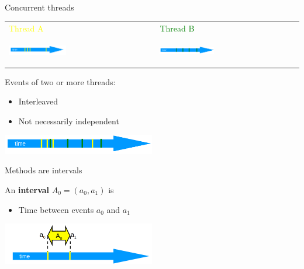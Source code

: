 \begin{frame}[fragile]{Concurrent threads}

\begin{tabular}{p{7cm}p{5cm}}
\textcolor{yellow}{Thread A}  & \textcolor{green}{Thread B} \\
\begin{center}
  \includegraphics[width=0.4\textwidth]{./pics/time/ThreadA.png}
\end{center}
&
\begin{center}
  \includegraphics[width=0.4\textwidth]{./pics/time/ThreadB.png}
\end{center}

\end{tabular}

Events of two or more threads:
\begin{itemize}
  \item Interleaved
  \item Not necessarily independent
\end{itemize}
\begin{center}
  \includegraphics[width=0.5\textwidth]{./pics/time/Interleavings.png}
\end{center}

\end{frame}

\begin{frame}[fragile]{Methods are intervals}

An \textbf{interval}  $A_0 =(a_0, a_1)$ is
\begin{itemize}
  \item Time between events $a_0$ and $a_1$ 
\end{itemize}

\begin{center}
  \includegraphics[width=0.5\textwidth]{./pics/time/Interval.png}
\end{center}
\end{frame}

